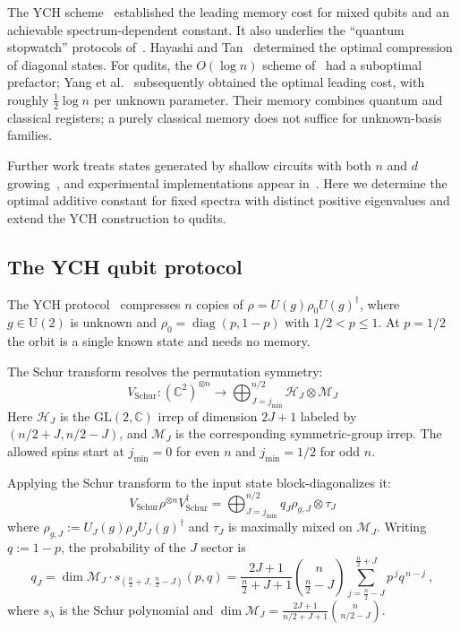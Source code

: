 \documentclass[a4paper,onecolumn,11pt]{quantumarticle}
\def\h{\mathcal{H}}
\def\map{\mathcal}
\begin{document}
The YCH scheme~\cite{yang2016optimal} established the leading memory
cost for mixed qubits and an achievable spectrum-dependent constant.
It also underlies the ``quantum stopwatch'' protocols
of~\cite{yang2018quantum,yang2018compressionfor}.
Hayashi and Tan~\cite{hayashi2017minimum} determined the optimal
compression of diagonal states. For qudits, the $O(\log n)$ scheme
of~\cite{yang2016efficient} had a suboptimal prefactor;
Yang et al.~\cite{yang2018compression} subsequently obtained the
optimal leading cost, with roughly $\frac12\log n$ per unknown
parameter. Their memory combines quantum and classical registers;
a purely classical memory does not suffice for unknown-basis families.

Further work treats states generated by shallow circuits with both
$n$ and $d$ growing~\cite{yang2025compression}, and experimental
implementations appear in~\cite{pivoluska2022implementation,xu2024experimental}.
Here we determine the optimal additive constant for fixed spectra
with distinct positive eigenvalues and extend the YCH construction
to qudits.


\subsection{The YCH qubit protocol}\label{sec:review}
The YCH protocol~\cite{yang2016optimal} compresses $n$ copies of
$\rho=U(g)\rho_0U(g)^\dagger$, where $g\in\mathrm U(2)$ is unknown
and $\rho_0=\operatorname{diag}(p,1-p)$ with $1/2<p\le1$.
At $p=1/2$ the orbit is a single known state and needs no memory.

The Schur transform resolves the permutation symmetry:
\begin{equation}
    V_\mathrm{Schur}: (\mathbb{C}^2)^{\otimes n} \to \bigoplus_{J=j_{\min}}^{n/2} \h_J \otimes \map{M}_J
\end{equation}
Here $\h_J$ is the $\mathrm{GL}(2,\mathbb C)$ irrep of dimension
$2J+1$ labeled by $(n/2+J,n/2-J)$, and $\map M_J$ is the
corresponding symmetric-group irrep. The allowed spins start at
$j_{\min}=0$ for even $n$ and $j_{\min}=1/2$ for odd $n$.

Applying the Schur transform to the input state block-diagonalizes it:
\begin{equation}\label{eq:schur}
    V_\mathrm{Schur} \rho^{\otimes n} V_\mathrm{Schur}^\dagger = \bigoplus_{J=j_{\min}}^{n/2} q_J \rho_{g,J} \otimes \tau_J
\end{equation}
where $\rho_{g,J}:=U_J(g)\rho_JU_J(g)^\dagger$ and $\tau_J$ is
maximally mixed on $\map M_J$. Writing $q:=1-p$, the probability
of the $J$ sector is
\begin{equation}\label{eq:qJ}
    q_J = \dim\map{M}_J\cdot s_{(\frac n2+J,\,\frac n2-J)}(p,q)
    = \frac{2J+1}{\frac n2+J+1}\binom{n}{\frac n2-J}\sum_{j=\frac n2-J}^{\frac n2+J} p^{\,j}q^{\,n-j}\ ,
\end{equation}
where $s_\lambda$ is the Schur polynomial and
$\dim\map M_J=\frac{2J+1}{n/2+J+1}\binom{n}{n/2-J}$.
\end{document}
